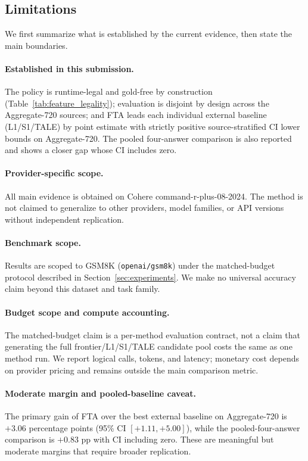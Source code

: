\subsection{Limitations}
\label{sec:limitations}

We first summarize what is established by the current evidence, then state the main boundaries.

\paragraph{Established in this submission.}
The policy is runtime-legal and gold-free by construction (Table~\ref{tab:feature_legality}); evaluation is disjoint by design across the Aggregate-720 sources; and FTA leads each individual external baseline (L1/S1/TALE) by point estimate with strictly positive source-stratified CI lower bounds on Aggregate-720. The pooled four-answer comparison is also reported and shows a closer gap whose CI includes zero.

\paragraph{Provider-specific scope.}
All main evidence is obtained on Cohere command-r-plus-08-2024. The method is not claimed to generalize to other providers, model families, or API versions without independent replication.

\paragraph{Benchmark scope.}
Results are scoped to GSM8K (\texttt{openai/gsm8k}) under the matched-budget protocol described in Section~\ref{sec:experiments}. We make no universal accuracy claim beyond this dataset and task family.

\paragraph{Budget scope and compute accounting.}
The matched-budget claim is a per-method evaluation contract, not a claim that generating the full frontier/L1/S1/TALE candidate pool costs the same as one method run. We report logical calls, tokens, and latency; monetary cost depends on provider pricing and remains outside the main comparison metric.

\paragraph{Moderate margin and pooled-baseline caveat.}
The primary gain of FTA over the best external baseline on Aggregate-720 is $+3.06$ percentage points (95\% CI $[+1.11, +5.00]$), while the pooled-four-answer comparison is $+0.83$ pp with CI including zero. These are meaningful but moderate margins that require broader replication.

